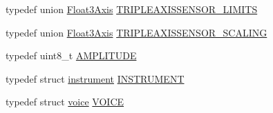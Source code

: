 \begin{DoxyCompactItemize}
\item 
typedef union \hyperlink{unionflame_1_1_float3_axis}{Float3\-Axis} \hyperlink{namespaceflame_a2b796938428096c98b4073492baf98a6}{T\-R\-I\-P\-L\-E\-A\-X\-I\-S\-S\-E\-N\-S\-O\-R\-\_\-\-L\-I\-M\-I\-T\-S}
\item 
typedef union \hyperlink{unionflame_1_1_float3_axis}{Float3\-Axis} \hyperlink{namespaceflame_a513ac03cc7f92c4b8d7cadb972e6be72}{T\-R\-I\-P\-L\-E\-A\-X\-I\-S\-S\-E\-N\-S\-O\-R\-\_\-\-S\-C\-A\-L\-I\-N\-G}
\item 
typedef uint8\-\_\-t \hyperlink{namespaceflame_a7f6447252c60127b805475b293831f99}{A\-M\-P\-L\-I\-T\-U\-D\-E}
\item 
typedef struct \hyperlink{structflame_1_1instrument}{instrument} \hyperlink{namespaceflame_a7f0c5adbd1329cd2947d15e6af02dbf1}{I\-N\-S\-T\-R\-U\-M\-E\-N\-T}
\item 
typedef struct \hyperlink{structflame_1_1voice}{voice} \hyperlink{namespaceflame_a69cbce86034387173caf0aaf772a5d3b}{V\-O\-I\-C\-E}
\end{DoxyCompactItemize}
